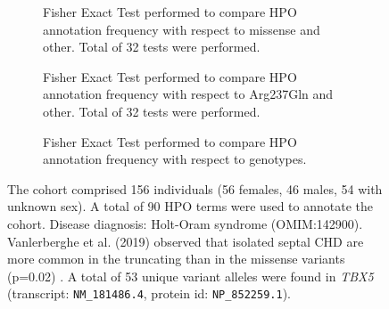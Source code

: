 \begin{figure}[htbp]
\begin{subfigure}[b]{0.95\textwidth}
\centering
{}
\captionsetup{justification=raggedright,singlelinecheck=false}
\caption{Fisher Exact Test performed to compare HPO annotation frequency with respect to missense and other. Total of
        32 tests were performed.}
\end{subfigure}
\vspace{2em}
\begin{subfigure}[b]{0.95\textwidth}
\centering
{}
\captionsetup{justification=raggedright,singlelinecheck=false}
\caption{Fisher Exact Test performed to compare HPO annotation frequency with respect to Arg237Gln and other. Total of
        32 tests were performed.}
\end{subfigure}
\vspace{2em}
\begin{subfigure}[b]{0.95\textwidth}
\centering
{}
\captionsetup{justification=raggedright,singlelinecheck=false}
\caption{Fisher Exact Test performed to compare HPO annotation frequency with respect to genotypes.}
\end{subfigure}

\vspace{2em}

\caption{ The cohort comprised 156 individuals (56 females, 46 males, 54 with unknown sex). 
A total of 90 HPO terms were used to annotate the cohort. Disease diagnosis: Holt-Oram syndrome (OMIM:142900).
Vanlerberghe et al. (2019) observed that isolated septal CHD are more common in the truncating than in 
the missense variants (p=0.02) \cite{PMID_30552424}.
A total of 53 unique variant alleles were found in \textit{TBX5} (transcript: \texttt{NM\_181486.4}, protein id: \texttt{NP\_852259.1}).}
\end{figure}
